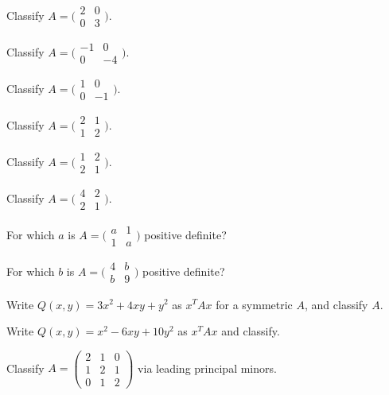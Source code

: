 \begin{problems}
    \item Classify $A = \bigl(\begin{smallmatrix} 2 & 0 \\ 0 & 3 \end{smallmatrix}\bigr)$.
    \item Classify $A = \bigl(\begin{smallmatrix} -1 & 0 \\ 0 & -4 \end{smallmatrix}\bigr)$.
    \item Classify $A = \bigl(\begin{smallmatrix} 1 & 0 \\ 0 & -1 \end{smallmatrix}\bigr)$.
    \item Classify $A = \bigl(\begin{smallmatrix} 2 & 1 \\ 1 & 2 \end{smallmatrix}\bigr)$.
    \item Classify $A = \bigl(\begin{smallmatrix} 1 & 2 \\ 2 & 1 \end{smallmatrix}\bigr)$.
    \item Classify $A = \bigl(\begin{smallmatrix} 4 & 2 \\ 2 & 1 \end{smallmatrix}\bigr)$.
    \item For which $a$ is $A = \bigl(\begin{smallmatrix} a & 1 \\ 1 & a \end{smallmatrix}\bigr)$ positive definite?
    \item For which $b$ is $A = \bigl(\begin{smallmatrix} 4 & b \\ b & 9 \end{smallmatrix}\bigr)$ positive definite?
    \item Write $Q(x, y) = 3 x^{2} + 4 x y + y^{2}$ as $x^{T} A x$ for a symmetric $A$, and classify $A$.
    \item Write $Q(x, y) = x^{2} - 6 x y + 10 y^{2}$ as $x^{T} A x$ and classify.
    \item Classify $A = \begin{pmatrix} 2 & 1 & 0 \\ 1 & 2 & 1 \\ 0 & 1 & 2 \end{pmatrix}$ via leading principal minors.

\end{problems}

